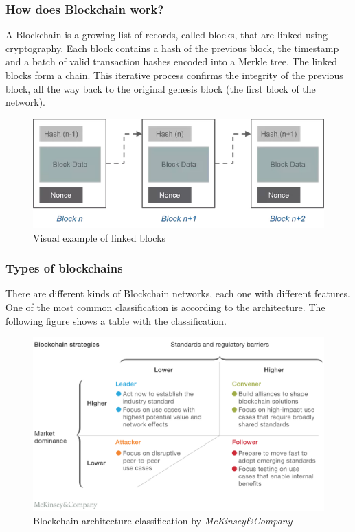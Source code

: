 \documentclass[a4paper, 12pt]{article} %
\begin{document}
        \subsubsection{How does Blockchain work?}
            A Blockchain is a growing list of records, called blocks, that are linked using cryptography. Each block contains a hash of the previous block, the timestamp and a batch of valid transaction hashes encoded into a Merkle tree. The linked blocks form a chain. This iterative process confirms the integrity of the previous block, all the way back to the original genesis block (the first block of the network).
            \begin{figure}[h]
                \centering
                \includegraphics[width=1.0\textwidth]{block-example.png}
                \caption{Visual example of linked blocks}
                \label{fig:linked_blocks}
            \end{figure}
            
        \subsubsection{Types of blockchains}
            There are different kinds of Blockchain networks, each one with different features. One of the most common classification is according to the architecture. The following figure shows a table with the classification.
            \begin{figure}[h]
                \centering
                \includegraphics[width=1.0\textwidth]{Blockchain-types.png}
                \caption{Blockchain architecture classification by \textit{McKinsey\&Company}}
                \label{fig:blockchain_classification}
            \end{figure}
\end{document}
